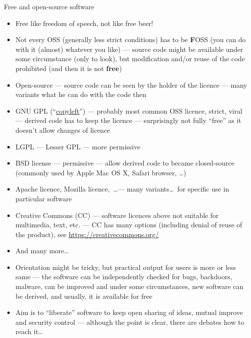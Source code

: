 \documentclass[compress, ucs, xelatex, 11pt, xcolor=svgnames,
  hyperref={
    bookmarks=true,
    unicode=true,
    colorlinks=true,
    pdftitle={Linux, command line and MetaCentrum},
    plainpages=false,
    pdfauthor={Vojtech Zeisek},
    pdfsubject={Course about use of Linux command line, writing shell scripts and using MetaCentrum of CESNET},
    pdfcreator={XeLaTeX, http://www.xelatex.org/},
    pdfkeywords={Linux, GNU, BASH, shell, command line, MetaCentrum},
    linkcolor=Sienna,
    anchorcolor=black,
    citecolor=green,
    filecolor=magenta,
    menucolor=Sienna,
    urlcolor=cyan,
    pdftex},
  url={hyphens, lowtilde} %
  ]{beamer}
\begin{document}
\begin{frame}[allowframebreaks]{Free and open-source software}
\begin{itemize}
  \item Free like freedom of speech, \alert{not} like free beer!
  \item Not every OSS (generally less strict conditions) has to be \textbf{F}OSS (you can do with it (almost) whatever you like) --- source code might be available under some circumstance (only to look), but modification and/or reuse of the code prohibited (and then it is not \textbf{free})
  \item Open-source --- source code can be seen by the holder of the licence --- many variants what he can do with the code then
  \item GNU GPL (``\href{https://www.gnu.org/copyleft/}{copyleft}'') --- probably most common OSS licence, strict, viral --- derived code has to keep the licence --- surprisingly not fully ``free'' as it doesn't allow changes of licence
  \item LGPL --- Lesser GPL --- more permissive
  \item BSD license --- permissive --- allow derived code to became closed-source (commonly used by Apple Mac OS X, Safari browser, \ldots)
  \item Apache licence, Mozilla licence,~\ldots --- many variants\ldots~for specific use in particular software
  \item Creative Commons (CC) --- software licences above not suitable for multimedia, text, etc. --- CC has many options (including denial of reuse of the product), see \url{https://creativecommons.org/}
  \item And many more\ldots
  \item Orientation might be tricky, but practical output for users is more or less same --- the software can be independently checked for bugs, backdoors, malware, can be improved and under some circumstances, new software can be derived, and usually, it is available for free
  \item Aim is to ``liberate'' software to keep open sharing of ideas, mutual improve and security control --- although the point is clear, there are debates how to reach it\ldots
\end{itemize}
\end{frame}
\end{document}
